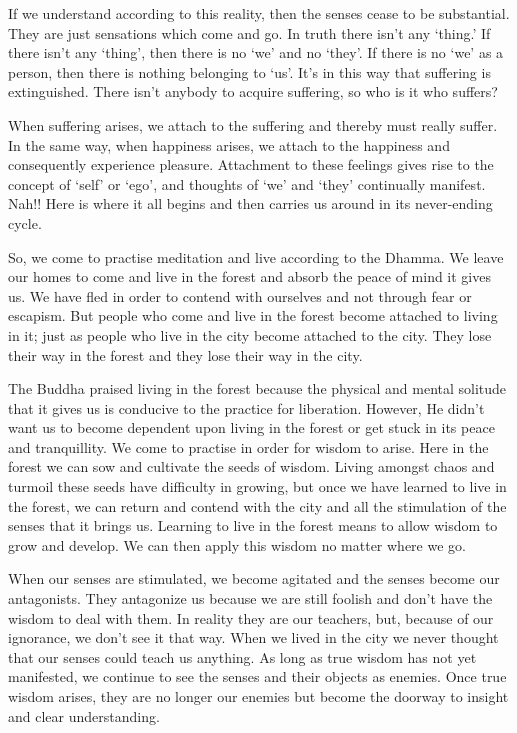 If we understand according to this reality, then the senses cease to be substantial. They are just sensations which come and go. In truth there isn't any `thing.' If there isn't any `thing', then there is no `we' and no `they'. If there is no `we' as a person, then there is nothing belonging to `us'. It's in this way that suffering is extinguished. There isn't anybody to acquire suffering, so who is it who suffers? 

When suffering arises, we attach to the suffering and thereby must really suffer. In the same way, when happiness arises, we attach to the happiness and consequently experience pleasure. Attachment to these feelings gives rise to the concept of `self' or `ego', and thoughts of `we' and `they' continually manifest. Nah!! Here is where it all begins and then carries us around in its never-ending cycle. 

So, we come to practise meditation and live according to the Dhamma. We leave our homes to come and live in the forest and absorb the peace of mind it gives us. We have fled in order to contend with ourselves and not through fear or escapism. But people who come and live in the forest become attached to living in it; just as people who live in the city become attached to the city. They lose their way in the forest and they lose their way in the city. 

The Buddha praised living in the forest because the physical and mental solitude that it gives us is conducive to the practice for liberation. However, He didn't want us to become dependent upon living in the forest or get stuck in its peace and tranquillity. We come to practise in order for wisdom to arise. Here in the forest we can sow and cultivate the seeds of wisdom. Living amongst chaos and turmoil these seeds have difficulty in growing, but once we have learned to live in the forest, we can return and contend with the city and all the stimulation of the senses that it brings us. Learning to live in the forest means to allow wisdom to grow and develop. We can then apply this wisdom no matter where we go. 

When our senses are stimulated, we become agitated and the senses become our antagonists. They antagonize us because we are still foolish and don't have the wisdom to deal with them. In reality they are our teachers, but, because of our ignorance, we don't see it that way. When we lived in the city we never thought that our senses could teach us anything. As long as true wisdom has not yet manifested, we continue to see the senses and their objects as enemies. Once true wisdom arises, they are no longer our enemies but become the doorway to insight and clear understanding. 

